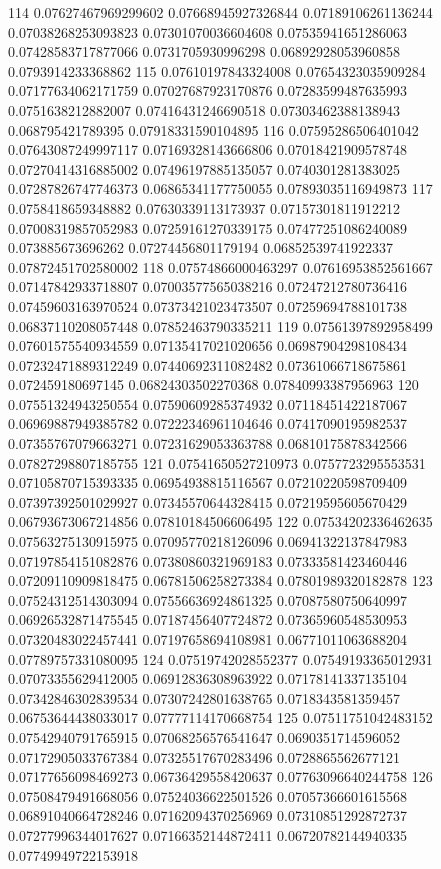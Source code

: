 114 0.07627467969299602 0.07668945927326844 0.07189106261136244 0.07038268253093823 0.07301070036604608 0.07535941651286063 0.07428583717877066 0.0731705930996298 0.06892928053960858 0.0793914233368862
115 0.07610197843324008 0.07654323035909284 0.07177634062171759 0.07027687923170876 0.07283599487635993 0.0751638212882007 0.07416431246690518 0.07303462388138943 0.068795421789395 0.07918331590104895
116 0.07595286506401042 0.07643087249997117 0.07169328143666806 0.07018421909578748 0.07270414316885002 0.07496197885135057 0.0740301281383025 0.07287826747746373 0.06865341177750055 0.07893035116949873
117 0.0758418659348882 0.07630339113173937 0.07157301811912212 0.07008319857052983 0.07259161270339175 0.07477251086240089 0.073885673696262 0.07274456801179194 0.06852539741922337 0.07872451702580002
118 0.07574866000463297 0.07616953852561667 0.07147842933718807 0.07003577565038216 0.07247212780736416 0.07459603163970524 0.07373421023473507 0.07259694788101738 0.06837110208057448 0.07852463790335211
119 0.07561397892958499 0.07601575540934559 0.07135417021020656 0.06987904298108434 0.07232471889312249 0.07440692311082482 0.07361066718675861 0.072459180697145 0.06824303502270368 0.07840993387956963
120 0.07551324943250554 0.07590609285374932 0.07118451422187067 0.06969887949385782 0.07222346961104646 0.07417090195982537 0.07355767079663271 0.07231629053363788 0.06810175878342566 0.07827298807185755
121 0.07541650527210973 0.0757723295553531 0.07105870715393335 0.06954938815116567 0.07210220598709409 0.07397392501029927 0.07345570644328415 0.07219595605670429 0.06793673067214856 0.07810184506606495
122 0.07534202336462635 0.07563275130915975 0.07095770218126096 0.06941322137847983 0.07197854151082876 0.07380860321969183 0.07333581423460446 0.07209110909818475 0.06781506258273384 0.07801989320182878
123 0.07524312514303094 0.07556636924861325 0.07087580750640997 0.06926532871475545 0.07187456407724872 0.07365960548530953 0.07320483022457441 0.07197658694108981 0.06771011063688204 0.07789757331080095
124 0.07519742028552377 0.07549193365012931 0.07073355629412005 0.06912836308963922 0.07178141337135104 0.07342846302839534 0.07307242801638765 0.0718343581359457 0.06753644438033017 0.07777114170668754
125 0.07511751042483152 0.07542940791765915 0.07068256576541647 0.0690351714596052 0.07172905033767384 0.07325517670283496 0.0728865562677121 0.07177656098469273 0.06736429558420637 0.07763096640244758
126 0.07508479491668056 0.07524036622501526 0.07057366601615568 0.06891040664728246 0.07162094370256969 0.07310851292872737 0.07277996344017627 0.07166352144872411 0.06720782144940335 0.07749949722153918

